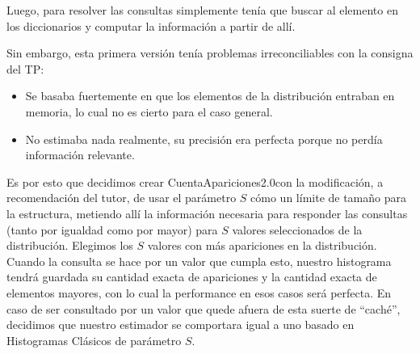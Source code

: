 Luego, para resolver las consultas simplemente tenía que buscar al elemento en los diccionarios y computar la información a partir de allí.

Sin embargo, esta primera versión tenía problemas irreconciliables con la consigna del TP:
\begin{itemize}
 \item Se basaba fuertemente en que los elementos de la distribución entraban en memoria, lo cual no es cierto para el caso general.
 \item No estimaba nada realmente, su precisión era perfecta porque no perdía información relevante.
\end{itemize}

Es por esto que decidimos crear CuentaApariciones2.0\texttrademark con la modificación, a recomendación del tutor, de usar el parámetro $S$ cómo un límite de tamaño para la estructura, metiendo allí la información necesaria para responder las consultas (tanto por igualdad como por mayor) para $S$ valores seleccionados de la distribución. Elegimos los $S$ valores con más apariciones en la distribución. Cuando la consulta se hace por un valor que cumpla esto, nuestro histograma tendrá guardada su cantidad exacta de apariciones y la cantidad exacta de elementos mayores, con lo cual la performance en esos casos será perfecta. En caso de ser consultado por un valor que quede afuera de esta suerte de ``caché'', decidimos que nuestro estimador se comportara igual a uno basado en Histogramas Clásicos de parámetro $S$.
